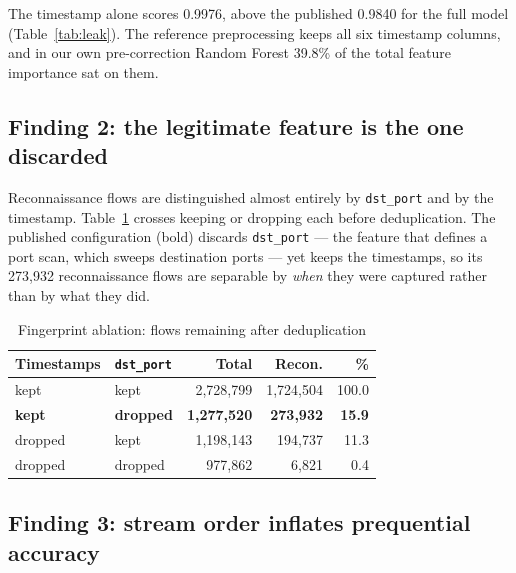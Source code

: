 \documentclass[conference]{IEEEtran}
\newcommand{\col}[1]{\texttt{\small #1}}
\begin{document}
The timestamp alone scores 0.9976, above the published 0.9840 for the full model (Table~\ref{tab:leak}). The reference preprocessing \cite{b4} keeps all six timestamp columns, and in our own pre-correction Random Forest 39.8\% of the total feature importance sat on them.

\subsection{Finding 2: the legitimate feature is the one discarded}

Reconnaissance flows are distinguished almost entirely by \col{dst\_port} and by the timestamp. Table~\ref{tab:ablation} crosses keeping or dropping each before deduplication. The published configuration (bold) discards \col{dst\_port} --- the feature that defines a port scan, which sweeps destination ports --- yet keeps the timestamps, so its 273,932 reconnaissance flows are separable by \emph{when} they were captured rather than by what they did.

\begin{table}[!t]
\caption{Fingerprint ablation: flows remaining after deduplication}
\label{tab:ablation}
\centering
\footnotesize
\begin{tabular}{@{}llrrr@{}}
\toprule
\textbf{Timestamps} & \textbf{\col{dst\_port}} & \textbf{Total} & \textbf{Recon.} & \textbf{\%} \\
\midrule
kept & kept & 2,728,799 & 1,724,504 & 100.0 \\
\textbf{kept} & \textbf{dropped} & \textbf{1,277,520} & \textbf{273,932} & \textbf{15.9} \\
dropped & kept & 1,198,143 & 194,737 & 11.3 \\
dropped & dropped & 977,862 & 6,821 & 0.4 \\
\bottomrule
\end{tabular}
\end{table}

\subsection{Finding 3: stream order inflates prequential accuracy}
\end{document}
